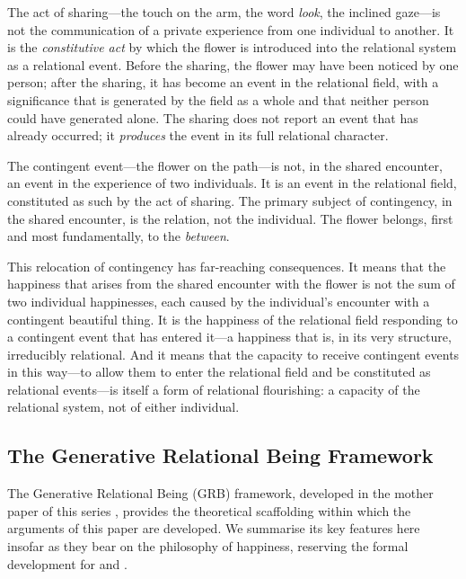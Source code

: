 The act of sharing---the touch on the arm, the word \emph{look}, the inclined gaze---is not the communication of a private experience from one individual to another. It is the \emph{constitutive act} by which the flower is introduced into the relational system as a relational event. Before the sharing, the flower may have been noticed by one person; after the sharing, it has become an event in the relational field, with a significance that is generated by the field as a whole and that neither person could have generated alone. The sharing does not report an event that has already occurred; it \emph{produces} the event in its full relational character.

\begin{claim}
The contingent event---the flower on the path---is not, in the shared encounter, an event in the experience of two individuals. It is an event in the relational field, constituted as such by the act of sharing. The primary subject of contingency, in the shared encounter, is the relation, not the individual. The flower belongs, first and most fundamentally, to the \emph{between}.
\end{claim}

This relocation of contingency has far-reaching consequences. It means that the happiness that arises from the shared encounter with the flower is not the sum of two individual happinesses, each caused by the individual's encounter with a contingent beautiful thing. It is the happiness of the relational field responding to a contingent event that has entered it---a happiness that is, in its very structure, irreducibly relational. And it means that the capacity to receive contingent events in this way---to allow them to enter the relational field and be constituted as relational events---is itself a form of relational flourishing: a capacity of the relational system, not of either individual.

\subsection{The Generative Relational Being Framework}
\label{p14:subsec:grb}

\noindent
The Generative Relational Being (GRB) framework, developed in the mother paper of this series \parencite{wan2024grb}, provides the theoretical scaffolding within which the arguments of this paper are developed. We summarise its key features here insofar as they bear on the philosophy of happiness, reserving the formal development for  and .

